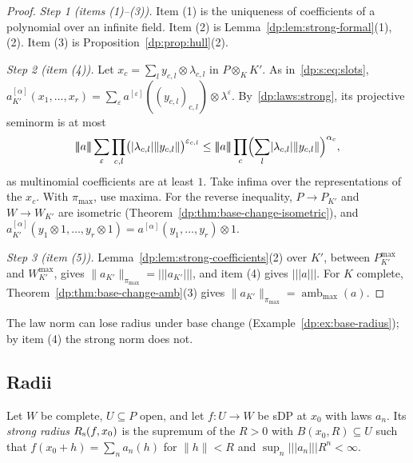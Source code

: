 \documentclass[11pt]{amsart}
\theoremstyle{definition}
\theoremstyle{remark}
\numberwithin{equation}{section}
\newcommand{\abs}[1]{\lvert #1\rvert}
\newcommand{\norm}[1]{\lVert #1\rVert}
\theoremstyle{plain}
\theoremstyle{definition}
\theoremstyle{plain}
\begin{document}
\begin{proof}
\emph{Step 1 (items (1)--(3)).} Item (1) is the uniqueness of coefficients of a polynomial over an infinite field. Item (2) is Lemma~\ref{dp:lem:strong-formal}(1),(2). Item (3) is Proposition~\ref{dp:prop:hull}(2).

\emph{Step 2 (item (4)).} Let $x_c=\sum_ly_{c,l}\otimes\lambda_{c,l}$ in $P\otimes_KK'$. As in~\eqref{dp:s:eq:slots}, $a_{K'}^{[\alpha]}(x_1,\dots,x_r)=\sum_\varepsilon a^{[\varepsilon]}((y_{c,l})_{c,l})\otimes\lambda^\varepsilon$. By~\eqref{dp:laws:strong}, its projective seminorm is at most
\[
 \lvert\!\lvert\!\lvert a\rvert\!\rvert\!\rvert\sum_\varepsilon\prod_{c,l}\bigl(\abs{\lambda_{c,l}}\norm{y_{c,l}}\bigr)^{\varepsilon_{c,l}}\le\lvert\!\lvert\!\lvert a\rvert\!\rvert\!\rvert\prod_c\Bigl(\sum_l\abs{\lambda_{c,l}}\norm{y_{c,l}}\Bigr)^{\alpha_c},
\]
as multinomial coefficients are at least $1$. Take infima over the representations of the $x_c$. With $\pi_{\max}$, use maxima. For the reverse inequality, $P\to P_{K'}$ and $W\to W_{K'}$ are isometric (Theorem~\ref{dp:thm:base-change-isometric}), and $a_{K'}^{[\alpha]}(y_1\otimes1,\dots,y_r\otimes1)=a^{[\alpha]}(y_1,\dots,y_r)\otimes1$.

\emph{Step 3 (item (5)).} Lemma~\ref{dp:lem:strong-coefficients}(2) over $K'$, between $P^{\max}_{K'}$ and $W^{\max}_{K'}$, gives $\norm{a_{K'}}_{\pi_{\max}}=\lvert\!\lvert\!\lvert a_{K'}\rvert\!\rvert\!\rvert$, and item (4) gives $\lvert\!\lvert\!\lvert a\rvert\!\rvert\!\rvert$. For $K$ complete, Theorem~\ref{dp:thm:base-change-amb}(3) gives $\norm{a_{K'}}_{\pi_{\max}}=\operatorname{amb}_{\max}(a)$.
\end{proof}

The law norm can lose radius under base change (Example~\ref{dp:ex:base-radius}); by item (4) the strong norm does not.

\subsection{Radii}\label{dp:s:ssec-radii}

Let $W$ be complete, $U\subseteq P$ open, and let $f\colon U\to W$ be sDP at $x_0$ with laws $a_n$. Its \emph{strong radius} $R_{\rm s}(f,x_0)$ is the supremum of the $R>0$ with $B(x_0,R)\subseteq U$ such that $f(x_0+h)=\sum_na_n(h)$ for $\norm h<R$ and $\sup_n\lvert\!\lvert\!\lvert a_n\rvert\!\rvert\!\rvert R^n<\infty$.
\end{document}
